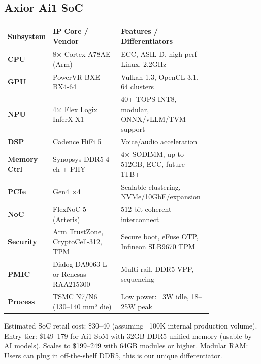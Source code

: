 \documentclass[12pt]{article}
\begin{document}
\begin{multicols}{2}
\subsection{Axior Ai1 SoC}
\begin{center}
\begin{tabular}{@{} >{\bfseries}l p{0.35\linewidth} p{0.45\linewidth} @{}} %
\toprule
\textbf{Subsystem}   & \textbf{IP Core / Vendor}           & \textbf{Features / Differentiators} \\
\midrule
CPU         & 8× Cortex-A78AE (Arm)     & ECC, ASIL-D, high-perf Linux, 2.2GHz \\
GPU         & PowerVR BXE-BX4-64        & Vulkan 1.3, OpenCL 3.1, 64 clusters \\
NPU         & 4× Flex Logix InferX X1   & 40+ TOPS INT8, modular, ONNX/vLLM/TVM support \\
DSP         & Cadence HiFi 5            & Voice/audio acceleration \\
Memory Ctrl & Synopsys DDR5 4-ch + PHY  & 4× SODIMM, up to 512GB, ECC, future 1TB+ \\
PCIe        & Gen4 ×4                   & Scalable clustering, NVMe/10GbE/expansion \\
NoC         & FlexNoC 5 (Arteris)       & 512-bit coherent interconnect \\
Security    & Arm TrustZone, CryptoCell-312, TPM & Secure boot, eFuse OTP, Infineon SLB9670 TPM \\
PMIC        & Dialog DA9063-L or Renesas RAA215300 & Multi-rail, DDR5 VPP, sequencing \\
Process     & TSMC N7/N6 (130–140 mm² die) & Low power: ~3W idle, 18–25W peak \\
\bottomrule
\end{tabular}
\end{center}
\vspace{0.5em}
\small Estimated SoC retail cost: \$30–40 (assuming ~100K internal production volume). Entry-tier: \$149–179 for Ai1 SoM with 32GB DDR5 unified memory (usable by AI models). Scales to \$199–249 with 64GB modules or higher. Modular RAM: Users can plug in off-the-shelf DDR5, this is our unique differentiator.

\vspace{1em}


\end{multicols}
\end{document}

